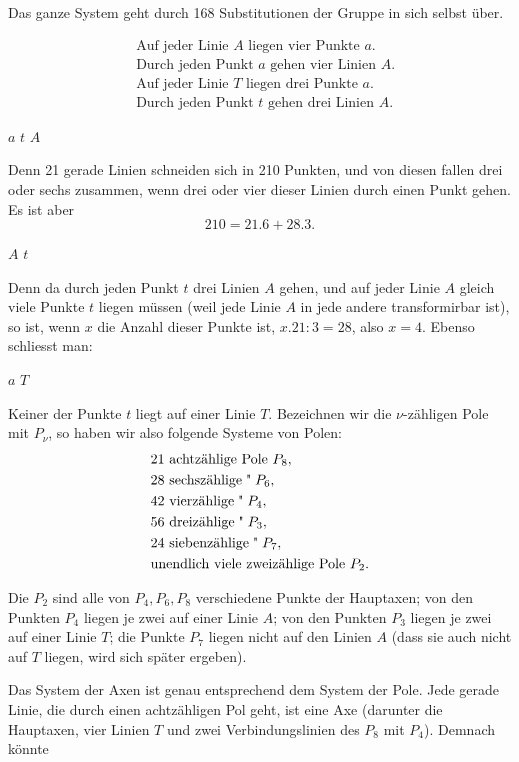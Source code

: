 Das ganze System geht durch 168 Substitutionen der Gruppe in sich selbst über.

\[
\begin{aligned}
&\text{Auf jeder Linie } A \text{ liegen vier Punkte } a. \\
&\text{Durch jeden Punkt } a \text{ gehen vier Linien } A. \\
&\text{Auf jeder Linie } T \text{ liegen drei Punkte } a. \\
&\text{Durch jeden Punkt } t \text{ gehen drei Linien } A.
\end{aligned}
\]

 $a$  $t$  $A$

Denn 21 gerade Linien schneiden sich in 210 Punkten, und von diesen fallen drei oder sechs zusammen, wenn drei oder vier dieser Linien durch einen Punkt gehen. Es ist aber
\[
210 = 21.6 + 28.3.
\]

 $A$  $t$

Denn da durch jeden Punkt $t$ drei Linien $A$ gehen, und auf jeder Linie $A$ gleich viele Punkte $t$ liegen müssen (weil jede Linie $A$ in jede andere transformirbar ist), so ist, wenn $x$ die Anzahl dieser Punkte ist, $x . 21 : 3 = 28$, also $x = 4$. Ebenso schliesst man:

 $a$  $T$

Keiner der Punkte $t$ liegt auf einer Linie $T$.
Bezeichnen wir die $\nu$-zähligen Pole mit $P_\nu$, so haben wir also folgende Systeme von Polen:
\[
\begin{aligned}
&21 \text{ achtzählige Pole } P_8, \\
&28 \text{ sechszählige} \;\text{\textquotedbl}\; P_6, \\
&42 \text{ vierzählige} \;\text{\textquotedbl}\; P_4, \\
&56 \text{ dreizählige} \;\text{\textquotedbl}\; P_3, \\
&24 \text{ siebenzählige} \;\text{\textquotedbl}\; P_7, \\
&\text{unendlich viele zweizählige Pole } P_2.
\end{aligned}
\]

Die $P_2$ sind alle von $P_4, P_6, P_8$ verschiedene Punkte der Hauptaxen; von den Punkten $P_4$ liegen je zwei auf einer Linie $A$; von den Punkten $P_3$ liegen je zwei auf einer Linie $T$; die Punkte $P_7$ liegen nicht auf den Linien $A$ (dass sie auch nicht auf $T$ liegen, wird sich später ergeben).

Das System der Axen ist genau entsprechend dem System der Pole. Jede gerade Linie, die durch einen achtzähligen Pol geht, ist eine Axe (darunter die Hauptaxen, vier Linien $T$ und zwei Verbindungslinien des $P_8$ mit $P_4$). Demnach könnte
